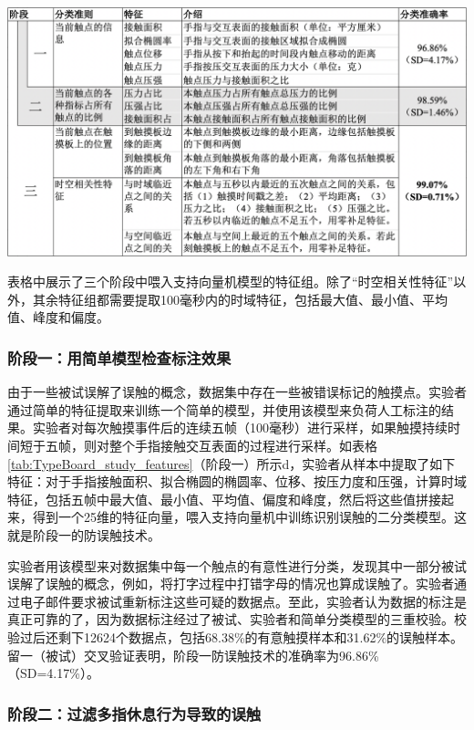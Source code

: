 \begin{table}[!tbh]
	\centering
	\includegraphics[width=1.0\linewidth]{figures/TypeBoard_features.png}
	\caption{表格中展示了三个阶段中喂入支持向量机模型的特征组。除了“时空相关性特征”以外，其余特征组都需要提取100毫秒内的时域特征，包括最大值、最小值、平均值、峰度和偏度。}
	\label{tab:TypeBoard_study_features}
\end{table}

\subsubsection{阶段一：用简单模型检查标注效果}

由于一些被试误解了误触的概念，数据集中存在一些被错误标记的触摸点。实验者通过简单的特征提取来训练一个简单的模型，并使用该模型来负荷人工标注的结果。实验者对每次触摸事件后的连续五帧（100毫秒）进行采样，如果触摸持续时间短于五帧，则对整个手指接触交互表面的过程进行采样。如表格\ref{tab:TypeBoard_study_features}（阶段一）所示d，实验者从样本中提取了如下特征：对于手指接触面积、拟合椭圆的椭圆率、位移、按压力度和压强，计算时域特征，包括五帧中最大值、最小值、平均值、偏度和峰度，然后将这些值拼接起来，得到一个25维的特征向量，喂入支持向量机中训练识别误触的二分类模型。这就是阶段一的防误触技术。

实验者用该模型来对数据集中每一个触点的有意性进行分类，发现其中一部分被试误解了误触的概念，例如，将打字过程中打错字母的情况也算成误触了。实验者通过电子邮件要求被试重新标注这些可疑的数据点。至此，实验者认为数据的标注是真正可靠的了，因为数据标注经过了被试、实验者和简单分类模型的三重校验。校验过后还剩下12624个数据点，包括68.38\%的有意触摸样本和31.62\%的误触样本。留一（被试）交叉验证表明，阶段一防误触技术的准确率为96.86\%（SD=4.17\%）。

\subsubsection{阶段二：过滤多指休息行为导致的误触}

